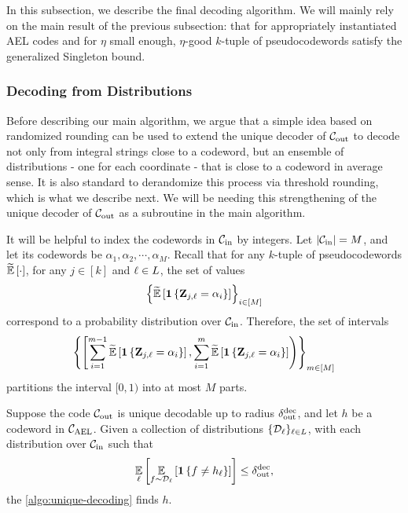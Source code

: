 In this subsection, we describe the final decoding algorithm. We will mainly rely on the main result of the previous subsection: that for appropriately instantiated AEL codes and for $\eta$ small enough, $\eta$-good $k$-tuple of pseudocodewords satisfy the generalized Singleton bound.

\subsubsection{Decoding from Distributions}
Before describing our main algorithm, we argue that a simple idea based on randomized rounding can be used to extend the unique decoder of $\calC_{\out}$ to decode not only from integral strings close to a codeword, but an ensemble of distributions - one for each coordinate - that is close to a codeword in average sense. It is also standard to derandomize this process via threshold rounding, which is what we describe next. We will be needing this strengthening of the unique decoder of $\calC_{\out}$ as a subroutine in the main algorithm.

It will be helpful to index the codewords in $\calC_{\inn}$ by integers. Let $\abs*{\calC_{\inn}} = M$, and let its codewords be $\alpha_1,\alpha_2,\cdots ,\alpha_M$. Recall that for any $k$-tuple of pseudocodewords $\tildeEx{\cdot}$, for any $j\in [k]$ and $\li \in L$, the set of values
\[
	\inbraces{ \tildeEx{\indi{\zee_{j,\li} = \alpha_i}} }_{i\in [M]}
\]
correspond to a probability distribution over $\calC_{\inn}$. Therefore, the set of intervals
\[
	\inbraces{ \left[\sum_{i=1}^{m-1} \tildeEx{\indi{\zee_{j,\li} = \alpha_i}}, \sum_{i=1}^{m} \tildeEx{\indi{\zee_{j,\li} = \alpha_i}} \right) }_{m\in [M]}
\]
partitions the interval $[0,1)$ into at most $M$ parts.

\begin{lemma}\label{lem:decode_from_distrib}
	Suppose the code $\calC_{\out}$ is unique decodable up to radius $\delta_{\out}^{\dec}$, and let $h$ be a codeword in $\AELC$. Given a collection of distributions $\{\calD_{\li}\}_{\li \in L}$, with each distribution over $\calC_{\inn}$ such that
	\[
		\Ex{\li}{\Ex{f\sim \calD_{\li}}{{\indi{f\neq h_{\li}}}}} \leq \delta_{\out}^{\dec},
	\]
	the \cref{algo:unique-decoding} finds $h$.
\end{lemma}

